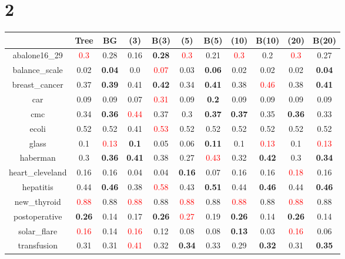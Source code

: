 \documentclass{article}%
\begin{document}
\section*{2}%
\begin{tabular}{c|cccccccccc}%
\hline%
&Tree&BG&(3)&B(3)&(5)&B(5)&(10)&B(10)&(20)&B(20)\\%
\hline%
abalone16\_29&\textcolor{red}{ 
0.3
}&0.28&0.16&\textbf{0.28}&\textcolor{red}{ 
0.3
}&0.21&\textcolor{red}{ 
0.3
}&0.2&\textcolor{red}{ 
0.3
}&0.27\\%
\hline%
balance\_scale&0.02&\textbf{0.04}&0.0&\textcolor{red}{ 
0.07
}&0.03&\textbf{0.06}&0.02&0.02&0.02&\textbf{0.04}\\%
\hline%
breast\_cancer&0.37&\textbf{0.39}&0.41&\textbf{0.42}&0.34&\textbf{0.41}&0.38&\textcolor{red}{ 
0.46
}&0.38&\textbf{0.41}\\%
\hline%
car&0.09&0.09&0.07&\textcolor{red}{ 
0.31
}&0.09&\textbf{0.2}&0.09&0.09&0.09&0.09\\%
\hline%
cmc&0.34&\textbf{0.36}&\textcolor{red}{ 
0.44
}&0.37&0.3&\textbf{0.37}&\textbf{0.37}&0.35&\textbf{0.36}&0.33\\%
\hline%
ecoli&0.52&0.52&0.41&\textcolor{red}{ 
0.53
}&0.52&0.52&0.52&0.52&0.52&0.52\\%
\hline%
glass&0.1&\textcolor{red}{ 
0.13
}&\textbf{0.1}&0.05&0.06&\textbf{0.11}&0.1&\textcolor{red}{ 
0.13
}&0.1&\textcolor{red}{ 
0.13
}\\%
\hline%
haberman&0.3&\textbf{0.36}&\textbf{0.41}&0.38&0.27&\textcolor{red}{ 
0.43
}&0.32&\textbf{0.42}&0.3&\textbf{0.34}\\%
\hline%
heart\_cleveland&0.16&0.16&0.04&0.04&\textbf{0.16}&0.07&0.16&0.16&\textcolor{red}{ 
0.18
}&0.16\\%
\hline%
hepatitis&0.44&\textbf{0.46}&0.38&\textcolor{red}{ 
0.58
}&0.43&\textbf{0.51}&0.44&\textbf{0.46}&0.44&\textbf{0.46}\\%
\hline%
new\_thyroid&\textcolor{red}{ 
0.88
}&0.88&\textcolor{red}{ 
0.88
}&0.88&\textcolor{red}{ 
0.88
}&0.88&\textcolor{red}{ 
0.88
}&0.88&\textcolor{red}{ 
0.88
}&0.88\\%
\hline%
postoperative&\textbf{0.26}&0.14&0.17&\textbf{0.26}&\textcolor{red}{ 
0.27
}&0.19&\textbf{0.26}&0.14&\textbf{0.26}&0.14\\%
\hline%
solar\_flare&\textcolor{red}{ 
0.16
}&0.14&\textcolor{red}{ 
0.16
}&0.12&0.08&0.08&\textbf{0.13}&0.03&\textcolor{red}{ 
0.16
}&0.06\\%
\hline%
transfusion&0.31&0.31&\textcolor{red}{ 
0.41
}&0.32&\textbf{0.34}&0.33&0.29&\textbf{0.32}&0.31&\textbf{0.35}\\%

\end{tabular}
\end{document}
